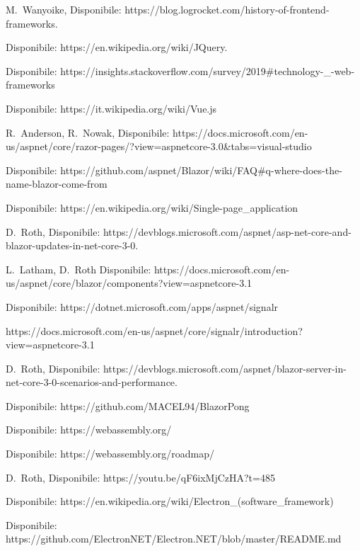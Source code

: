 \begin{thebibliography}{999}

M.~Wanyoike,
Disponibile: https://blog.logrocket.com/history-of-frontend-frameworks.

Disponibile: https://en.wikipedia.org/wiki/JQuery.

Disponibile:
https://insights.stackoverflow.com/survey/2019\#technology-\_-web-frameworks

Disponibile: https://it.wikipedia.org/wiki/Vue.js

R.~Anderson,
R.~Nowak,
Disponibile: https://docs.microsoft.com/en-us/aspnet/core/razor-pages/?view=aspnetcore-3.0\&tabs=visual-studio

Disponibile: https://github.com/aspnet/Blazor/wiki/FAQ\#q-where-does-the-name-blazor-come-from

Disponibile: https://en.wikipedia.org/wiki/Single-page\_application

D.~Roth,
Disponibile: https://devblogs.microsoft.com/aspnet/asp-net-core-and-blazor-updates-in-net-core-3-0.

L.~Latham, D.~Roth
Disponibile: https://docs.microsoft.com/en-us/aspnet/core/blazor/components?view=aspnetcore-3.1

Disponibile: https://dotnet.microsoft.com/apps/aspnet/signalr

https://docs.microsoft.com/en-us/aspnet/core/signalr/introduction?view=aspnetcore-3.1

D.~Roth,
Disponibile: https://devblogs.microsoft.com/aspnet/blazor-server-in-net-core-3-0-scenarios-and-performance.

Disponibile: https://github.com/MACEL94/BlazorPong

Disponibile: https://webassembly.org/

Disponibile: https://webassembly.org/roadmap/

D.~Roth,
Disponibile:
https://youtu.be/qF6ixMjCzHA?t=485

Disponibile:
https://en.wikipedia.org/wiki/Electron\_(software\_framework)

Disponibile: https://github.com/ElectronNET/Electron.NET/blob/master/README.md


\end{thebibliography}
